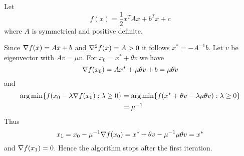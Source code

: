 Let 
\[
       f(x) = \frac{1}{2} x^T{A}x + b^T x + c
\]
where \( A \) is symmetrical and positive definite. 

\proof{}
Since \( \nabla {f(x)} = Ax + b \) and \( \nabla^2 {f(x)} = A > 0 \) it follows \( x^* = -A^{-1}b \).
Let \( v \) be eigenvector with \( Av = \mu v \). For \( x_0 = x^* + \theta v \) we have
\[ 
    \nabla {f(x_0)} = Ax^* + \mu \theta v + b = \mu \theta v 
\] 
and 
\[
    \begin{split}
        \operatorname*{arg\,min} \{ f(x_0 - \lambda \nabla f(x_0) : \lambda \ge 0 \} 
            & = \operatorname*{arg\,min} \{ f(x^* + \theta v - \lambda \mu \theta v) : \lambda \ge 0 \} \\
            & = \mu^{-1} 
    \end{split}
\]
Thus        
\[
    x_1 = x_0 - \mu^{-1} \nabla f(x_0) = x^* + \theta v - \mu^{-1} \mu \theta v = x^*
\]
and \( \nabla {f(x_1)} = 0 \). Hence the algorithm stops after the first iteration.
\bigskip

